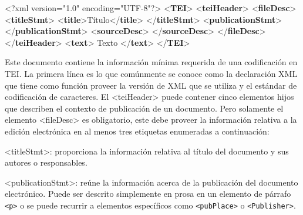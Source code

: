 \documentclass[
]{book}
\newenvironment{Shaded}{\begin{snugshade}}{\end{snugshade}}
\newcommand{\FunctionTok}[1]{\textcolor[rgb]{0.00,0.00,0.00}{#1}}
\newcommand{\KeywordTok}[1]{\textcolor[rgb]{0.13,0.29,0.53}{\textbf{#1}}}
\newcommand{\NormalTok}[1]{#1}
\newcommand{\OtherTok}[1]{\textcolor[rgb]{0.56,0.35,0.01}{#1}}
\newcommand{\StringTok}[1]{\textcolor[rgb]{0.31,0.60,0.02}{#1}}
\begin{document}
\begin{Shaded}
\begin{Highlighting}[]
\FunctionTok{\textless{}?xml}\OtherTok{ version=}\StringTok{"1.0"}\OtherTok{ encoding=}\StringTok{"UTF{-}8"}\FunctionTok{?\textgreater{}}
\NormalTok{\textless{}}\KeywordTok{TEI}\NormalTok{\textgreater{}}
\NormalTok{  \textless{}}\KeywordTok{teiHeader}\NormalTok{\textgreater{}}
\NormalTok{      \textless{}}\KeywordTok{fileDesc}\NormalTok{\textgreater{}}
\NormalTok{         \textless{}}\KeywordTok{titleStmt}\NormalTok{\textgreater{}}
\NormalTok{            \textless{}}\KeywordTok{title}\NormalTok{\textgreater{}Título\textless{}/}\KeywordTok{title}\NormalTok{\textgreater{}}
\NormalTok{         \textless{}/}\KeywordTok{titleStmt}\NormalTok{\textgreater{}}
\NormalTok{         \textless{}}\KeywordTok{publicationStmt}\NormalTok{\textgreater{}}
\NormalTok{         \textless{}/}\KeywordTok{publicationStmt}\NormalTok{\textgreater{}}
\NormalTok{         \textless{}}\KeywordTok{sourceDesc}\NormalTok{\textgreater{}}
\NormalTok{         \textless{}/}\KeywordTok{sourceDesc}\NormalTok{\textgreater{}}
\NormalTok{      \textless{}/}\KeywordTok{fileDesc}\NormalTok{\textgreater{}}
\NormalTok{  \textless{}/}\KeywordTok{teiHeader}\NormalTok{\textgreater{}}
\NormalTok{  \textless{}}\KeywordTok{text}\NormalTok{\textgreater{}}
\NormalTok{      Texto}
\NormalTok{  \textless{}/}\KeywordTok{text}\NormalTok{\textgreater{}}
\NormalTok{\textless{}/}\KeywordTok{TEI}\NormalTok{\textgreater{}}
\end{Highlighting}
\end{Shaded}

Este documento contiene la información mínima requerida de una codificación en TEI.
La primera línea es lo que comúnmente se conoce como la declaración XML que tiene como función proveer la versión de XML que se utiliza y el estándar de codificación de caracteres.
El { \textless teiHeader\textgreater{} } puede contener cinco elementos hijos que describen el contexto de publicación de un documento. Pero solamente el elemento { \textless fileDesc\textgreater{} } es obligatorio, este debe proveer la información relativa a la edición electrónica en al menos tres etiquetas enumeradas a continuación:

{ \textless titleStmt\textgreater{}}: proporciona la información relativa al título del documento y sus autores o responsables.

{ \textless publicationStmt\textgreater{}}: reúne la información acerca de la publicación del documento electrónico. Puede ser descrito simplemente en prosa en un elemento de párrafo \texttt{\textless{}p\textgreater{}} o se puede recurrir a elementos específicos como \texttt{\textless{}pubPlace\textgreater{}} o \texttt{\textless{}Publisher\textgreater{}}.
\end{document}
